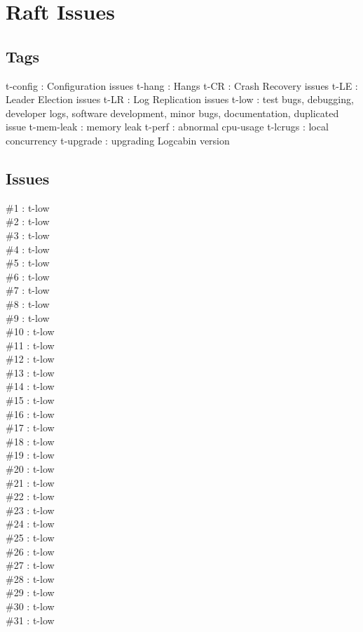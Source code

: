 \section{Raft Issues}
\subsection{Tags}
t-config : Configuration issues
t-hang : Hangs
t-CR : Crash Recovery issues
t-LE : Leader Election issues
t-LR : Log Replication issues
t-low : test bugs, debugging, developer logs, software development, minor bugs, documentation, duplicated issue
t-mem-leak : memory leak
t-perf : abnormal cpu-usage
t-lcrugs : local concurrency
t-upgrade : upgrading Logcabin version
\subsection{Issues}
\#1 : t-low\\
\#2 : t-low\\
\#3 : t-low\\
\#4 : t-low\\
\#5 : t-low\\
\#6 : t-low\\
\#7 : t-low\\
\#8 : t-low\\
\#9 : t-low\\
\#10 : t-low\\
\#11 : t-low\\
\#12 : t-low\\
\#13 : t-low\\
\#14 : t-low\\
\#15 : t-low\\
\#16 : t-low\\
\#17 : t-low\\
\#18 : t-low\\
\#19 : t-low\\
\#20 : t-low\\
\#21 : t-low\\
\#22 : t-low\\
\#23 : t-low\\
\#24 : t-low\\
\#25 : t-low\\
\#26 : t-low\\
\#27 : t-low\\
\#28 : t-low\\
\#29 : t-low\\
\#30 : t-low\\
\#31 : t-low\\
